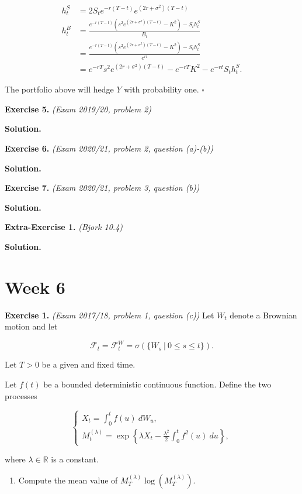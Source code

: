 \documentclass[
]{book}
\providecommand{\tightlist}{%
  \setlength{\itemsep}{0pt}\setlength{\parskip}{0pt}}
\begin{document}
\begin{align*}
h_t^S&=2S_te^{-r(T-t)}e^{(2r+\sigma^2)(T-t)}\\
h_t^B&=\frac{e^{-r(T-t)}\left(s^2e^{(2r+\sigma^2)(T-t)}-K^2\right)-S_th_t^S}{B_t}\\
&=\frac{e^{-r(T-t)}\left(s^2e^{(2r+\sigma^2)(T-t)}-K^2\right)-S_th_t^S}{e^{rt}}\\
&=e^{-rT}s^2e^{(2r+\sigma^2)(T-t)}-e^{-rT}K^2-e^{-rt}S_th_t^S.
\end{align*}

The portfolio above will hedge \(Y\) with probability one. \(\square\)

\textbf{Exercise 5.} \emph{(Exam 2019/20, problem 2)}

\textbf{Solution.}

\textbf{Exercise 6.} \emph{(Exam 2020/21, problem 2, question (a)-(b))}

\textbf{Solution.}

\textbf{Exercise 7.} \emph{(Exam 2020/21, problem 3, question (b))}

\textbf{Solution.}

\textbf{Extra-Exercise 1.} \emph{(Bjork 10.4)}

\textbf{Solution.}

\hypertarget{week-6}{%
\section{Week 6}\label{week-6}}

\textbf{Exercise 1.} \emph{(Exam 2017/18, problem 1, question (c))} Let \(W_t\) denote a Brownian motion and let

\[
\mathcal{F}_t=\mathcal{F}_t^W=\sigma(\{W_s\ \vert\ 0\le s\le t\}).
\]

Let \(T>0\) be a given and fixed time.

Let \(f(t)\) be a bounded deterministic continuous function. Define the two processes

\[
\begin{cases}
X_t=\int_0^tf(u)\ dW_u,\\
M^{(\lambda)}_t=\exp\left\{\lambda X_t-\frac{\lambda^2}{2}\int_0^t f^2(u)\ du\right\},
\end{cases}
\]

where \(\lambda\in\mathbb{R}\) is a constant.

\begin{enumerate}
\def\labelenumi{\alph{enumi}.}
\setcounter{enumi}{2}
\tightlist
\item
  Compute the mean value of \(M^{(\lambda)}_T\log(M^{(\lambda)}_T)\).
\end{enumerate}
\end{document}
